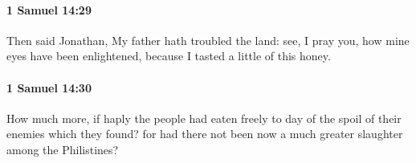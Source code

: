 		\paragraph{1 Samuel 14:29} %
			\label{1SAMUEL-14-29}

			Then said Jonathan, My father hath troubled the land: see, I pray you, how mine eyes have been enlightened, because I tasted a little of this honey.


		\paragraph{1 Samuel 14:30} %
			\label{1SAMUEL-14-30}

			How much more, if haply the people had eaten freely to day of the spoil of their enemies which they found? for had there not been now a much greater slaughter among the Philistines?


